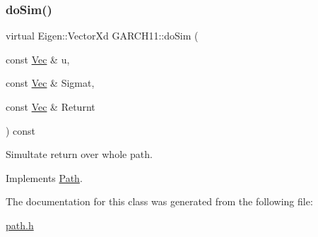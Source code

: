 \subsubsection{\texorpdfstring{do\+Sim()}{doSim()}}
{\footnotesize\ttfamily virtual Eigen\+::\+Vector\+Xd G\+A\+R\+C\+H11\+::do\+Sim (\begin{DoxyParamCaption}\item[{const \hyperlink{compute__returns__eigen_8h_a1eb6a9306ef406d7975f3cbf2e247777}{Vec} \&}]{u,  }\item[{const \hyperlink{compute__returns__eigen_8h_a1eb6a9306ef406d7975f3cbf2e247777}{Vec} \&}]{Sigmat,  }\item[{const \hyperlink{compute__returns__eigen_8h_a1eb6a9306ef406d7975f3cbf2e247777}{Vec} \&}]{Returnt }\end{DoxyParamCaption}) const\hspace{0.3cm}{\ttfamily [virtual]}}



Simultate return over whole path. 



Implements \hyperlink{classPath_a8917612a585bce52dbd52b1b643a517a}{Path}.



The documentation for this class was generated from the following file\+:\begin{DoxyCompactItemize}
\item 
\hyperlink{path_8h}{path.\+h}\end{DoxyCompactItemize}
